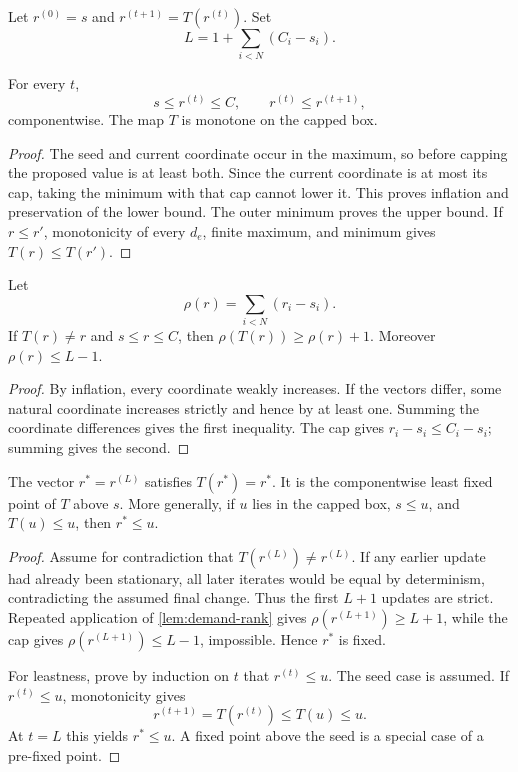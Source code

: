 Let \(r^{(0)}=s\) and \(r^{(t+1)}=T(r^{(t)})\).  Set
\[
  L=1+\sum_{i<N}(C_i-s_i).
\]

\begin{lemma}\label{lem:demand-inflation}
For every \(t\),
\[
  s\le r^{(t)}\le C,
  \qquad r^{(t)}\le r^{(t+1)},
\]
componentwise.  The map \(T\) is monotone on the capped box.
\end{lemma}

\begin{proof}
The seed and current coordinate occur in the maximum, so before capping the proposed value is at least both.  Since the current coordinate is at most its cap, taking the minimum with that cap cannot lower it.  This proves inflation and preservation of the lower bound.  The outer minimum proves the upper bound.  If \(r\le r'\), monotonicity of every \(d_e\), finite maximum, and minimum gives \(T(r)\le T(r')\).
\end{proof}

\begin{lemma}\label{lem:demand-rank}
Let
\[
  \rho(r)=\sum_{i<N}(r_i-s_i).
\]
If \(T(r)\ne r\) and \(s\le r\le C\), then \(\rho(T(r))\ge\rho(r)+1\).  Moreover \(\rho(r)\le L-1\).
\end{lemma}

\begin{proof}
By inflation, every coordinate weakly increases.  If the vectors differ, some natural coordinate increases strictly and hence by at least one.  Summing the coordinate differences gives the first inequality.  The cap gives \(r_i-s_i\le C_i-s_i\); summing gives the second.
\end{proof}

\begin{theorem}\label{thm:capped-closure}
The vector \(r^*=r^{(L)}\) satisfies \(T(r^*)=r^*\).  It is the componentwise least fixed point of \(T\) above \(s\).  More generally, if \(u\) lies in the capped box, \(s\le u\), and \(T(u)\le u\), then \(r^*\le u\).
\end{theorem}

\begin{proof}
Assume for contradiction that \(T(r^{(L)})\ne r^{(L)}\).  If any earlier update had already been stationary, all later iterates would be equal by determinism, contradicting the assumed final change.  Thus the first \(L+1\) updates are strict.  Repeated application of \cref{lem:demand-rank} gives \(\rho(r^{(L+1)})\ge L+1\), while the cap gives \(\rho(r^{(L+1)})\le L-1\), impossible.  Hence \(r^*\) is fixed.

For leastness, prove by induction on \(t\) that \(r^{(t)}\le u\).  The seed case is assumed.  If \(r^{(t)}\le u\), monotonicity gives
\[
  r^{(t+1)}=T(r^{(t)})\le T(u)\le u.
\]
At \(t=L\) this yields \(r^*\le u\).  A fixed point above the seed is a special case of a pre-fixed point.
\end{proof}

